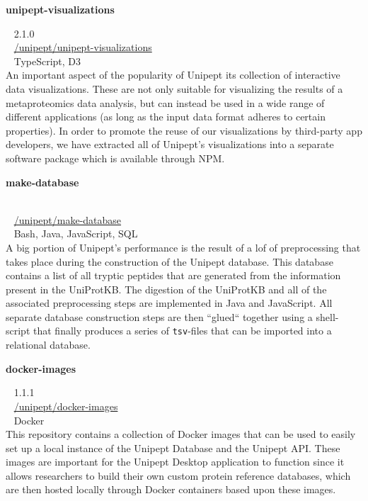 \begin{large}\textbf{\textsf{unipept-visualizations}}\end{large} \hfill \faTag ~ \textsf{2.1.0} \\
\faGithub ~ \href{https://github.com/unipept/unipept-visualizations}{\textsf{/unipept/unipept-visualizations}} \\
\faCode ~ \textsf{TypeScript, D3} \\
An important aspect of the popularity of Unipept its collection of interactive data visualizations.
These are not only suitable for visualizing the results of a metaproteomics data analysis, but can instead be used in a wide range of different applications (as long as the input data format adheres to certain properties).
In order to promote the reuse of our visualizations by third-party app developers, we have extracted all of Unipept's visualizations into a separate software package which is available through NPM.

\begin{large}\textbf{\textsf{make-database}}\end{large} \\
\faGithub ~ \href{https://github.com/unipept/make-database}{\textsf{/unipept/make-database}} \\
\faCode ~ \textsf{Bash, Java, JavaScript, SQL} \\
A big portion of Unipept's performance is the result of a lof of preprocessing that takes place during the construction of the Unipept database.
This database contains a list of all tryptic peptides that are generated from the information present in the UniProtKB.
The digestion of the UniProtKB and all of the associated preprocessing steps are implemented in Java and JavaScript.
All separate database construction steps are then ``glued`` together using a shell-script that finally produces a series of \texttt{tsv}-files that can be imported into a relational database.

\begin{large}\textbf{\textsf{docker-images}}\end{large} \hfill \faTag ~ \textsf{1.1.1} \\
\faGithub ~ \href{https://github.com/unipept/docker-images}{\textsf{/unipept/docker-images}} \\
\faCode ~ \textsf{Docker} \\
This repository contains a collection of Docker images that can be used to easily set up a local instance of the Unipept Database and the Unipept API.
These images are important for the Unipept Desktop application to function since it allows researchers to build their own custom protein reference databases, which are then hosted locally through Docker containers based upon these images.

